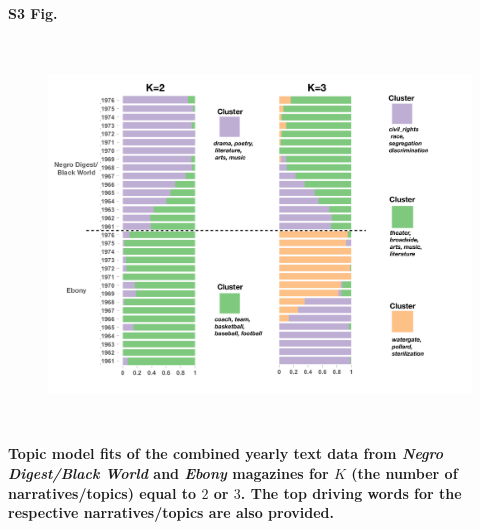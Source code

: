 \documentclass[10pt,letterpaper]{article}
\begin{document}
\paragraph*{S3 Fig.}

\begin{figure}[ht]
\centering
\includegraphics[height=4in, width=6in]{SuppFig3.pdf}
\end{figure}
\label{figS3}
{\bf Topic model fits of the combined yearly text data from \emph{Negro Digest/Black World} and \emph{Ebony} magazines for $K$ (the number of narratives/topics) equal to $2$ or $3$. The top driving words for the respective narratives/topics are also provided.}
\end{document}
